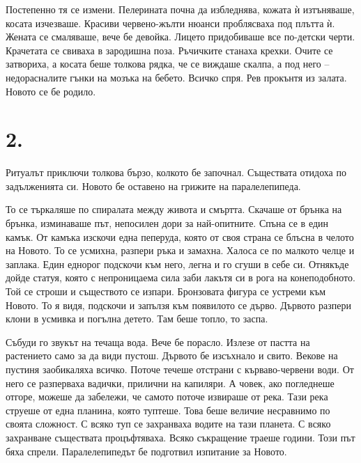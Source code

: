 \documentclass[ebook,openany,12pt]{memoir}
\begin{document}
Постепенно тя се измени. Пелерината почна да избледнява, кожата ѝ изтъняваше, косата изчезваше. Красиви червено-жълти нюанси проблясваха под плътта ѝ. Жената се смаляваше, вече бе девойка. Лицето придобиваше все по-детски черти. Крачетата се свиваха в зародишна поза. Ръчичките станаха крехки. Очите се затвориха, а косата беше толкова рядка, че се виждаше скалпа, а под него – недорасналите гънки на мозъка на бебето. Всичко спря. Рев прокънтя из залата. Новото се бе родило.

\section*{2.}

Ритуалът приключи толкова бързо, колкото бе започнал. Съществата отидоха по задълженията си. Новото бе оставено на грижите на паралелепипеда.

То се търкаляше по спиралата между живота и смър\-тта. Скачаше от брънка на брънка, изминаваше път, непосилен дори за най-опитните. Спъна се в един камък. От камъка изскочи една пеперуда, която от своя страна се блъсна в челото на Новото. То се усмихна, разпери ръка и замахна. Халоса се по малкото челце и заплака. Един еднорог подскочи към него, легна и го сгуши в себе си. Отнякъде дойде статуя, която с непроницаема сила заби лакътя си в рога на конеподобното. Той се строши и съществото се изпари. Бронзовата фигура се устреми към Новото. То я видя, подскочи и запълзя към появилото се дърво. Дървото разпери клони в усмивка и погълна детето. Там беше топло, то заспа.

Събуди го звукът на течаща вода. Вече бе порасло. Излезе от пастта на растението само за да види пустош. Дървото бе изсъхнало и свито. Векове на пустиня заобикаляха всичко. Поточе течеше отстрани с кърваво-червени води. От него се разперваха вадички, прилични на капиляри. А човек, ако погледнеше отгоре, можеше да забележи, че самото поточе извираше от река. Тази река струеше от една планина, която туптеше. Това беше величие несравнимо по своята сложност. С всяко туп се захранваха водите на тази планета. С всяко захранване съществата процъфтяваха. Всяко съкращение траеше години. Този път бяха спрели. Паралелепипедът бе подготвил изпитание за Новото.
\end{document}
